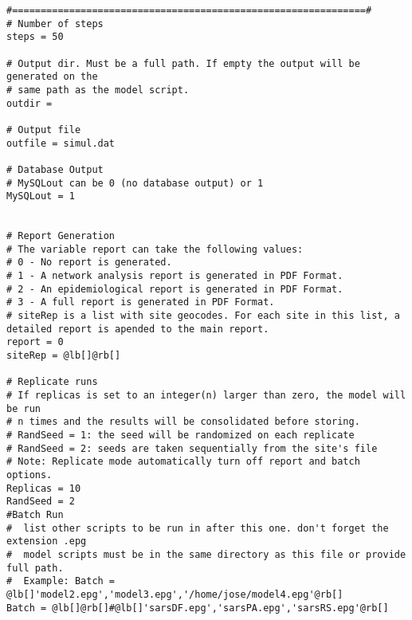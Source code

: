 \documentclass[a4paper,10pt]{manual}
\begin{document}
\begin{Verbatim}[commandchars=@\[\]]
#==============================================================#
# Number of steps
steps = 50

# Output dir. Must be a full path. If empty the output will be generated on the
# same path as the model script.
outdir =

# Output file
outfile = simul.dat

# Database Output
# MySQLout can be 0 (no database output) or 1
MySQLout = 1


# Report Generation
# The variable report can take the following values:
# 0 - No report is generated.
# 1 - A network analysis report is generated in PDF Format.
# 2 - An epidemiological report is generated in PDF Format.
# 3 - A full report is generated in PDF Format.
# siteRep is a list with site geocodes. For each site in this list, a detailed report is apended to the main report.
report = 0
siteRep = @lb[]@rb[]

# Replicate runs
# If replicas is set to an integer(n) larger than zero, the model will be run
# n times and the results will be consolidated before storing.
# RandSeed = 1: the seed will be randomized on each replicate
# RandSeed = 2: seeds are taken sequentially from the site's file
# Note: Replicate mode automatically turn off report and batch options.
Replicas = 10
RandSeed = 2
#Batch Run
#  list other scripts to be run in after this one. don't forget the extension .epg
#  model scripts must be in the same directory as this file or provide full path.
#  Example: Batch = @lb[]'model2.epg','model3.epg','/home/jose/model4.epg'@rb[]
Batch = @lb[]@rb[]#@lb[]'sarsDF.epg','sarsPA.epg','sarsRS.epg'@rb[]
\end{Verbatim}
\end{document}
